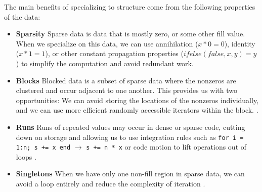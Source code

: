     The main benefits of specializing to structure come from the following properties of the data:
    \begin{itemize}
        \item \textbf{Sparsity} Sparse data is data that is mostly zero, or some other
        fill value. When we specialize on this data, we can use annihilation ($x
        * 0 = 0$), identity ($x * 1 = 1$), or other constant propagation
        properties ($ifelse(false, x, y) = y$) to simplify the computation and avoid
        redundant work.
        
        \item \textbf{Blocks} Blocked data is a subset of sparse data where the nonzeros
        are clustered and occur adjacent to one another. This provides us with
        two opportunities: We can avoid storing the locations of the nonzeros
        individually, and we can use more efficient randomly accessible
        iterators within the block. \cite{im_optimizing_2001, vuduc_performance_2002, ahrens_looplets_2023}.

        \item \textbf{Runs} Runs of repeated values may occur in dense or sparse code,
        cutting down on storage and allowing us to use integration rules such as 
        \texttt{for i = 1:n; s += x end} $\rightarrow$
        \texttt{s += n * x} or code motion to lift operations out of loops \cite{donenfeld_unified_2022,ahrens_looplets_2023}.

        \item \textbf{Singletons} When we have only one non-fill region in sparse data,
        we can avoid a loop entirely and reduce the complexity of iteration \cite{ghorbani2023compiling, ahrens_looplets_2023}.
    \end{itemize}


